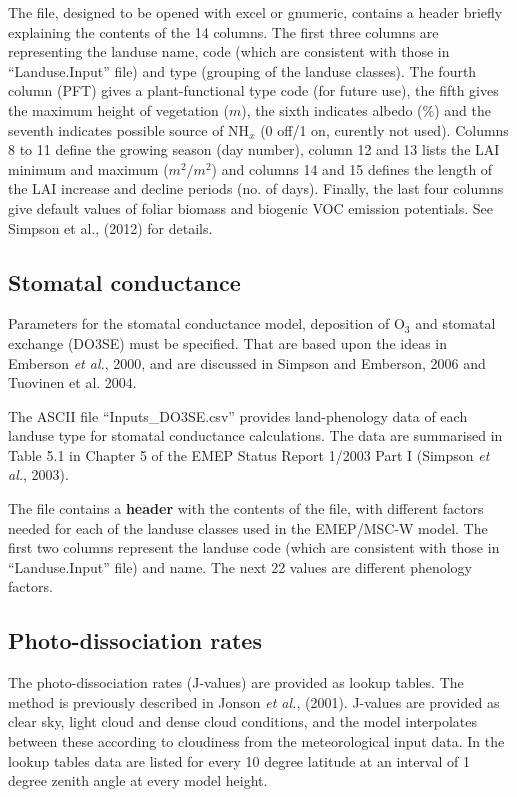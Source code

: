 The file, designed to be opened with excel or gnumeric,
contains a header briefly explaining the contents of the 
14 columns. 
The first three columns are representing the landuse name, code (which
are consistent with those in ``Landuse.Input'' file) and
type (grouping of the landuse classes). The fourth column 
(PFT) gives a plant-functional type code (for future use),
 the fifth gives
the maximum height of vegetation ($m$), the sixth indicates albedo (\%) and
the seventh indicates possible source of NH$_{x}$ (0 off/1 on,
curently not used). Columns 8 to 11
define the growing season (day number), column 12 and 13 lists the
LAI minimum  and maximum ($m^{2}/m^{2}$) and 
columns 14 and 15
defines the length of the LAI increase and decline periods (no. of days).
Finally, the last four columns give default values of 
foliar biomass and biogenic VOC emission potentials. See Simpson
et al., (2012) for details.


\subsection{Stomatal conductance}
Parameters for the stomatal conductance model, deposition of O$_{3}$ and
stomatal exchange (DO3SE) must be specified. That are based upon the ideas in
Emberson {\sl et al.}, 2000, and are discussed in Simpson and Emberson,
2006 and Tuovinen et al. 2004.

The  ASCII file ``Inputs\_DO3SE.csv'' provides land-phenology data
of each landuse type for stomatal conductance calculations. The 
data are summarised in Table 5.1 in Chapter 5 of the EMEP 
Status Report 1/2003 Part I (Simpson {\sl et al.}, 2003).

The file contains a {\bf header} with the contents of the file,
with different factors needed for each of the landuse classes used
in the EMEP/MSC-W model. The first two columns represent the
landuse code (which are consistent with those in ``Landuse.Input'' file)
and name. The next 22 values are different phenology factors.


\subsection{Photo-dissociation rates}
The photo-dissociation rates (J-values) are provided as lookup
tables. The method is previously described in Jonson {\sl et
al.}, (2001). J-values are provided as clear sky, light cloud and dense
cloud conditions, and the model interpolates between these according
to cloudiness from the meteorological input data. In the lookup tables
data are listed for every 10 degree latitude at an interval of 1
degree zenith angle at every model height.

